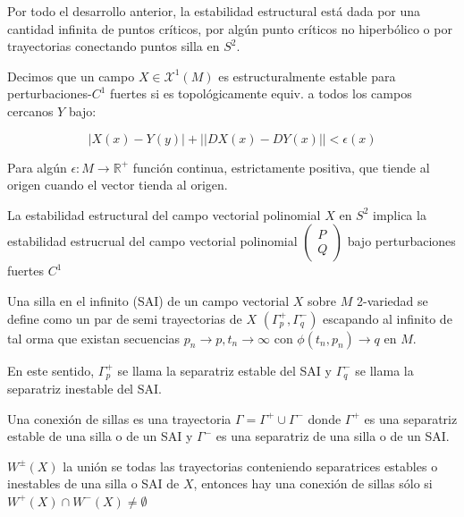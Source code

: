\begin{rmrk}
	Por todo el desarrollo anterior, la estabilidad estructural está dada por una cantidad infinita de puntos críticos, por algún punto críticos no hiperbólico o por trayectorias conectando puntos silla en $S^2$.
\end{rmrk}

\begin{defn}
	Decimos que un campo $X\in \mathcal{X}^1(M)$ es estructuralmente estable para perturbaciones-$C^1$ fuertes si es topológicamente equiv. a todos los campos cercanos $Y$ bajo:
	
	\begin{equation*}
		|X(x)-Y(y)| + ||DX(x)-DY(x)||< \epsilon(x)
	\end{equation*}
	
	Para algún $\epsilon:M\to \mathbb{R}^+$ función continua, estrictamente positiva, que tiende al origen cuando el vector tienda al origen.
\end{defn}

\begin{rmrk}
	La estabilidad estructural del campo vectorial polinomial $X$ en $S^2$ implica la  estabilidad estrucrual del campo vectorial polinomial $\begin{pmatrix}
		P\\
		Q
	\end{pmatrix}$ bajo perturbaciones fuertes $C^1$
\end{rmrk}

\begin{defn}
	Una silla en el infinito (SAI) de un campo vectorial $X$ sobre $M$ 2-variedad se define como un par de semi trayectorias de $X$ $(\Gamma_p^+,\Gamma_q^-)$ escapando al infinito de tal orma que existan secuencias $p_n\to p, t_n \to \infty $ con $\phi(t_n,p_n)\to q$ en $M$.
	
	En este sentido, $\Gamma_p^+$ se llama la separatriz estable del SAI y $\Gamma_q^-$ se llama la separatriz inestable del SAI.
	
	Una conexión de sillas es una trayectoria $\Gamma = \Gamma^+\cup \Gamma^-$ donde $\Gamma^+$ es una separatriz estable de una silla o de un SAI y  $\Gamma^-$ es una separatriz de una silla o de un SAI.
	
	$W^\pm(X)$ la unión se todas las trayectorias conteniendo separatrices estables o inestables de una silla o SAI de $X$, entonces hay una conexión de sillas sólo si $W^+(X)\cap W^-(X)\neq \emptyset$ 
\end{defn}

